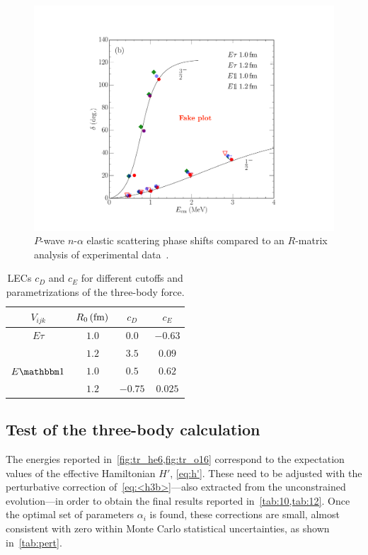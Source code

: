 \documentclass[aps,prc,twocolumn,superscriptaddress,floatfix]{revtex4-1}
\begin{document}
\begin{figure}[htb]
\includegraphics[width=\linewidth]{nalpha.pdf}
\caption[]{$P$-wave $n$-$\alpha$ elastic scattering phase shifts compared to an $R$-matrix analysis
of experimental data~\cite{???}.}
\label{fig:nalpha}
\end{figure}

\begin{table}[htb]
\centering
\caption[]{LECs $c_D$ and $c_E$ for different cutoffs and parametrizations of the three-body force.}
\begin{tabular}{cccc}
\hline\hline
$V_{ijk}$    & $R_0\,(\rm fm)$ & $c_D$ & $c_E$ \\
\hline
$E\tau$      & $1.0$ & $0.0$   & $-0.63$ \\
             & $1.2$ & $3.5$   & $0.09$  \\
$E\mathbbm1$ & $1.0$ & $0.5$   & $0.62$  \\
             & $1.2$ & $-0.75$ & $0.025$ \\
\hline\hline
\end{tabular}
\label{tab:3bfit}
\end{table}


\subsection{Test of the three-body calculation}
The energies reported in~\cref{fig:tr_he6,fig:tr_o16} correspond to the
expectation values of the effective Hamiltonian $H'$, \cref{eq:h'}. 
These need to be adjusted with the perturbative correction of~\cref{eq:<h3b>}---also extracted 
from the unconstrained evolution---in order to obtain the final results reported in~\cref{tab:10,tab:12}. 
Once the optimal set of parameters $\alpha_i$ is found, these corrections are small,
almost consistent with zero within Monte Carlo statistical uncertainties,
as shown in~\cref{tab:pert}.
\end{document}
